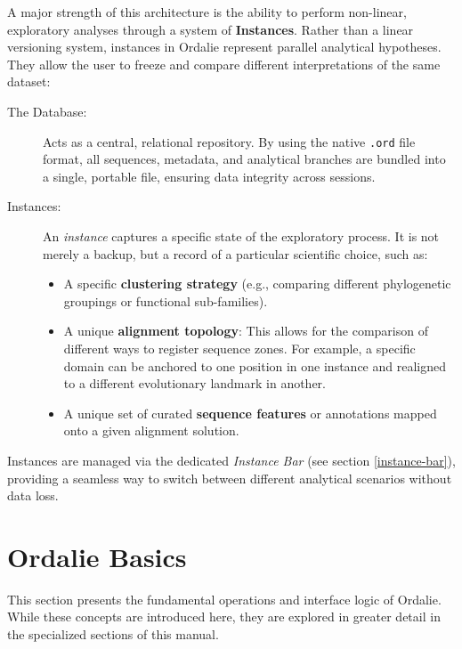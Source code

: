 \documentclass[a4paper]{article}
\begin{document}
A major strength of this architecture is the ability to perform non-linear, exploratory analyses through a system of \textbf{Instances}. Rather than a linear versioning system, instances in Ordalie represent parallel analytical hypotheses. They allow the user to freeze and compare different interpretations of the same dataset:

\begin{description}
    \item[The Database:] Acts as a central, relational repository. By using the native \texttt{.ord} file format, all sequences, metadata, and analytical branches are bundled into a single, portable file, ensuring data integrity across sessions.
    \item[Instances:] An \textit{instance} captures a specific state of the exploratory process. It is not merely a backup, but a record of a particular scientific choice, such as:
    \begin{itemize}
        \item A specific \textbf{clustering strategy} (e.g., comparing different phylogenetic groupings or functional sub-families).
        \item A unique \textbf{alignment topology}: This allows for the comparison of different ways to register sequence zones. For example, a specific domain can be anchored to one position in one instance and realigned to a different evolutionary landmark in another.
        \item A unique set of curated \textbf{sequence features} or annotations mapped onto a given alignment solution.
    \end{itemize}
\end{description}

Instances are managed via the dedicated \textit{Instance Bar} (see section \ref{instance-bar}), providing a seamless way to switch between different analytical scenarios without data loss.

\newpage
\section{Ordalie Basics}
This section presents the fundamental operations and interface logic of Ordalie. While these concepts are introduced here, they are explored in greater detail in the specialized sections of this manual.
\end{document}

